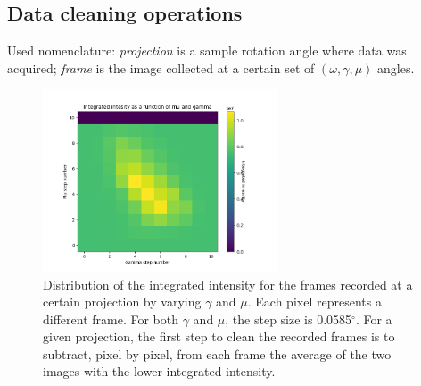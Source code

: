 \documentclass[11pt]{scrartcl}
\begin{document}
\subsection{Data cleaning operations}
\label{subs:data_cleaning}

Used nomenclature: {\emph{projection}} is a sample rotation angle where data was acquired; {\emph{frame}} is the image collected at a certain set of $(\omega, \gamma, \mu)$ angles.

\begin{figure}
    \centering
    \includegraphics[width=0.62\textwidth]{Distr_I_int}
    \caption{Distribution of the integrated intensity for the frames recorded at a certain projection by varying $\gamma$ and $\mu$. Each pixel represents a different frame. For both $\gamma$ and $\mu$, the step size is 0.0585$^{\circ}$. For a given projection, the first step to clean the recorded frames is to subtract, pixel by pixel, from each frame the average of the two images with the lower integrated intensity.}
    \label{fig:distr_I_int}
\end{figure}
\end{document}
